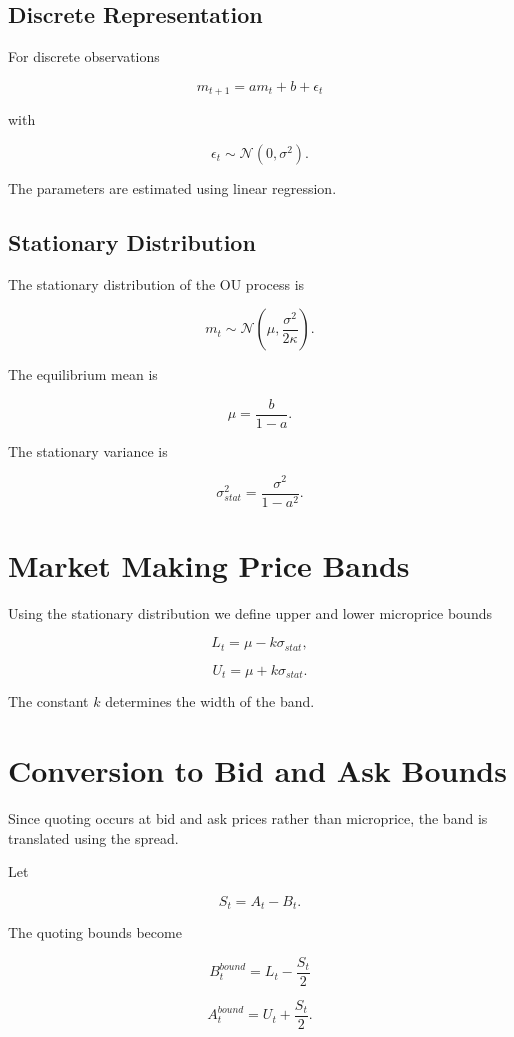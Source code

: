 \documentclass[11pt]{article}
\begin{document}
\subsection{Discrete Representation}

For discrete observations

\[
m_{t+1} = a m_t + b + \epsilon_t
\]

with

\[
\epsilon_t \sim \mathcal{N}(0,\sigma^2).
\]

The parameters are estimated using linear regression.

\subsection{Stationary Distribution}

The stationary distribution of the OU process is

\[
m_t \sim
\mathcal{N}\left(
\mu,
\frac{\sigma^2}{2\kappa}
\right).
\]

The equilibrium mean is

\[
\mu = \frac{b}{1-a}.
\]

The stationary variance is

\[
\sigma_{stat}^2 = \frac{\sigma^2}{1-a^2}.
\]

\section{Market Making Price Bands}

Using the stationary distribution we define upper and lower microprice bounds

\[
L_t = \mu - k\sigma_{stat},
\]

\[
U_t = \mu + k\sigma_{stat}.
\]

The constant $k$ determines the width of the band.

\section{Conversion to Bid and Ask Bounds}

Since quoting occurs at bid and ask prices rather than microprice, the band is translated using the spread.

Let

\[
S_t = A_t - B_t.
\]

The quoting bounds become

\[
B_t^{bound} = L_t - \frac{S_t}{2}
\]

\[
A_t^{bound} = U_t + \frac{S_t}{2}.
\]
\end{document}
